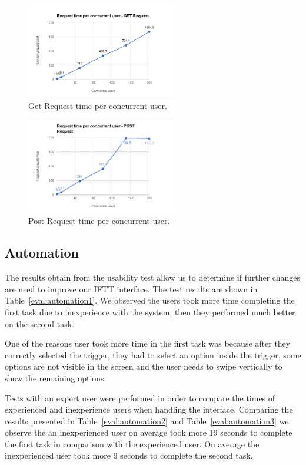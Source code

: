 \begin{figure}[H]
\centering
\includegraphics[width=0.6\textwidth]{Figures/bench_get}
\caption{Get Request time per concurrent user.}
\label{eval:server1}
\end{figure}

\begin{figure}[H]
\centering
\includegraphics[width=0.6\textwidth]{Figures/bench_post}
\caption{Post Request time per concurrent user.}
\label{eval:server2}
\end{figure}





\subsection{Automation}

The results obtain from the usability test allow us to determine if further changes are need to improve our \ac{IFTT} interface. The test results are shown in  Table~\ref{eval:automation1}. We observed the users took more time completing the first task due to inexperience with the system, then they performed much better on the second task. 

One of the reasons user took more time in the first task was because after they correctly selected the trigger, they had to select an option inside the trigger, some options are not visible in the screen and the user needs to swipe vertically to show the remaining options.

Tests with an expert user were performed in order to compare the times of experienced and inexperience users when handling the interface. Comparing the results presented in Table~\ref{eval:automation2} and Table~\ref{eval:automation3} we observe the an inexperienced user on average took more 19 seconds to complete the first task in comparison with the experienced user. On average the inexperienced user took more 9 seconds to complete the second task.


